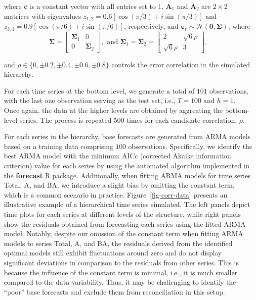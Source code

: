 \documentclass[11pt,a4paper,]{article}
\begin{document}
where \(\boldsymbol{c}\) is a constant vector with all entries set to
\(1\), \(\boldsymbol{A}_1\) and \(\boldsymbol{A}_2\) are \(2 \times 2\)
matrices with eigenvalues
\(z_{1,2}=0.6[\cos (\pi / 3) \pm i \sin (\pi / 3)]\) and
\(z_{3,4}=0.9[\cos (\pi / 6) \pm i \sin (\pi / 6)]\), respectively, and
\(\boldsymbol{\varepsilon}_t \sim \mathcal{N}(\boldsymbol{0}, \boldsymbol{\Sigma})\),
where \[
\boldsymbol{\Sigma}=\left[\begin{array}{cc}
\boldsymbol{\Sigma}_1 & 0 \\0 & \boldsymbol{\Sigma}_2
\end{array}\right], \text { and } \boldsymbol{\Sigma}_1=\boldsymbol{\Sigma}_2=\left[\begin{array}{cc}2 & \sqrt{6} \rho \\\sqrt{6} \rho & 3\end{array}\right],
\]

and \(\rho \in \{0, \pm 0.2, \pm 0.4, \pm 0.6, \pm 0.8\}\) controls the
error correlation in the simulated hierarchy.

For each time series at the bottom level, we generate a total of \(101\)
observations, with the last one observation serving as the test set,
i.e., \(T=100\) and \(h=1\). Once again, the data at the higher levels
are obtained by aggreating the bottom-level series. The process is
repeated \(500\) times for each candidate correlation, \(\rho\).

For each series in the hierarchy, base forecasts are generated from ARMA
models based on a training data comprising \(100\) observations.
Specifically, we identify the best ARMA model with the minimum AICc
(corrected Akaike information criterion) value for each series by using
the automated algorithm implemented in the \textbf{forecast} R package.
Additionally, when fitting ARMA models for time series Total, A, and BA,
we introduce a slight bias by omitting the constant term, which is a
common scenario in practice. Figure~\ref{fig-corr-data} presents an
illustrative example of a hierarchical time series simulated. The left
panels depict time plots for each series at different levels of the
structure, while right panels show the residuals obtained from
forecasting each series using the fitted ARMA model. Notably, despite
our omission of the constant term when fitting ARMA models to series
Total, A, and BA, the residuals derived from the identified optimal
models still exhibit fluctuations around zero and do not display
significant deviations in comparison to the residuals from other series.
This is because the influence of the constant term is minimal, i.e., it
is much smaller compared to the data variability. Thus, it may be
challenging to identify the ``poor'' base forecasts and exclude them
from reconciliation in this setup.
\end{document}
